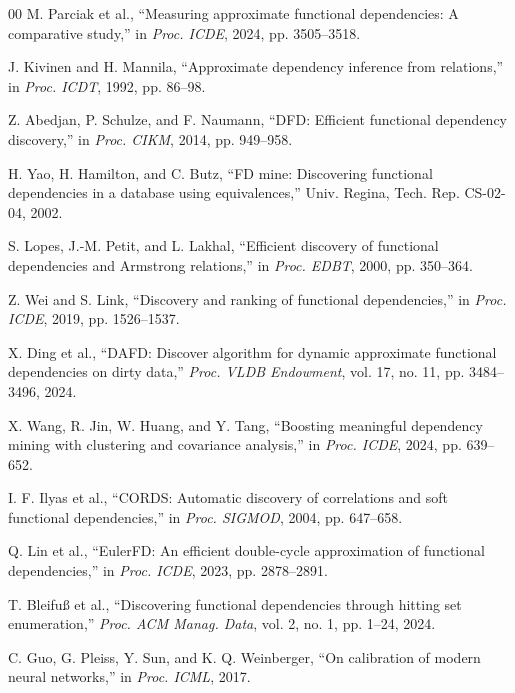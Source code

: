 \documentclass[conference]{IEEEtran}
\begin{document}
\begin{thebibliography}{00}
M. Parciak et al., ``Measuring approximate functional dependencies: A comparative study,'' in \textit{Proc. ICDE}, 2024, pp. 3505--3518.

J. Kivinen and H. Mannila, ``Approximate dependency inference from relations,'' in \textit{Proc. ICDT}, 1992, pp. 86--98.

Z. Abedjan, P. Schulze, and F. Naumann, ``DFD: Efficient functional dependency discovery,'' in \textit{Proc. CIKM}, 2014, pp. 949--958.

H. Yao, H. Hamilton, and C. Butz, ``FD mine: Discovering functional dependencies in a database using equivalences,'' Univ. Regina, Tech. Rep. CS-02-04, 2002.

S. Lopes, J.-M. Petit, and L. Lakhal, ``Efficient discovery of functional dependencies and Armstrong relations,'' in \textit{Proc. EDBT}, 2000, pp. 350--364.

Z. Wei and S. Link, ``Discovery and ranking of functional dependencies,'' in \textit{Proc. ICDE}, 2019, pp. 1526--1537.

X. Ding et al., ``DAFD: Discover algorithm for dynamic approximate functional dependencies on dirty data,'' \textit{Proc. VLDB Endowment}, vol. 17, no. 11, pp. 3484--3496, 2024.

X. Wang, R. Jin, W. Huang, and Y. Tang, ``Boosting meaningful dependency mining with clustering and covariance analysis,'' in \textit{Proc. ICDE}, 2024, pp. 639--652.

I. F. Ilyas et al., ``CORDS: Automatic discovery of correlations and soft functional dependencies,'' in \textit{Proc. SIGMOD}, 2004, pp. 647--658.

Q. Lin et al., ``EulerFD: An efficient double-cycle approximation of functional dependencies,'' in \textit{Proc. ICDE}, 2023, pp. 2878--2891.

T. Bleifu\ss{} et al., ``Discovering functional dependencies through hitting set enumeration,'' \textit{Proc. ACM Manag. Data}, vol. 2, no. 1, pp. 1--24, 2024.

C. Guo, G. Pleiss, Y. Sun, and K. Q. Weinberger, ``On calibration of modern neural networks,'' in \textit{Proc. ICML}, 2017.

\end{thebibliography}
\end{document}
